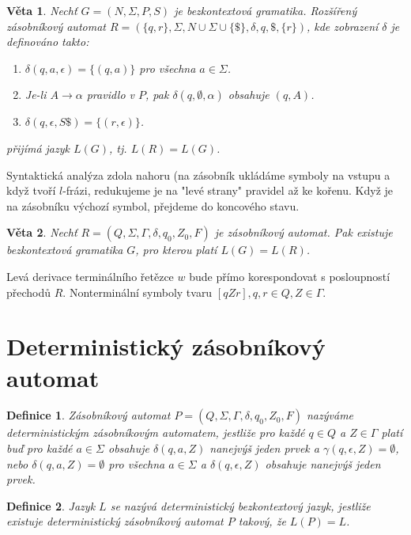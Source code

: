 \documentclass[a4paper, 11pt]{report}
\newtheorem{mydef}{Definice}[chapter]
\newtheorem{veta}{Věta}[chapter]
\begin{document}
\begin{veta}
Nechť $G = (N, \Sigma, P, S)$ je bezkontextová gramatika. Rozšířený zásobníkový automat $R = (\{q,r\}, \Sigma, N \cup \Sigma \cup \{\$\}, \delta, q, \$, \{r\})$, kde zobrazení $\delta$ je definováno takto:
\begin{enumerate}
	\item $\delta(q, a, \epsilon) = \{(q, a)\}$ pro všechna $a \in \Sigma$.
	\item Je-li $A \to \alpha$ pravidlo v $P$, pak $\delta(q, \emptyset, \alpha)$ obsahuje $(q, A)$.
	\item $\delta(q, \epsilon, S\$) = \{(r, \epsilon)\}$.
\end{enumerate}
přijímá jazyk $L(G)$, tj. $L(R) = L(G)$.
\end{veta}

Syntaktická analýza zdola nahoru (na zásobník ukládáme symboly na vstupu a když tvoří $l$-frázi, redukujeme je na "levé strany" pravidel až ke kořenu. Když je na zásobníku výchozí symbol, přejdeme do koncového stavu.

\begin{veta}
Nechť $R = (Q, \Sigma, \Gamma, \delta, q_0, Z_0, F)$ je zásobníkový automat. Pak existuje bezkontextová gramatika $G$, pro kterou platí $L(G) = L(R)$.
\end{veta}
Levá derivace terminálního řetězce $w$ bude přímo korespondovat s posloupností přechodů $R$. Nonterminální symboly tvaru $[qZr], q,r \in Q, Z \in \Gamma$.

\section{Deterministický zásobníkový automat}

\begin{mydef}
Zásobníkový automat $P = (Q, \Sigma, \Gamma, \delta, q_0, Z_0, F)$ nazýváme deterministickým zásobníkovým automatem, jestliže pro každé $q \in Q$ a $Z \in \Gamma$ platí buď pro každé $a \in \Sigma$ obsahuje $\delta(q, a, Z)$ nanejvýš jeden prvek a $\gamma(q, \epsilon, Z) = \emptyset$, nebo $\delta(q, a, Z) = \emptyset$ pro všechna $a \in \Sigma$ a $\delta(q, \epsilon, Z)$ obsahuje nanejvýš jeden prvek.
\end{mydef}

\begin{mydef}
Jazyk $L$ se nazývá \emph{deterministický bezkontextový jazyk}, jestliže existuje deterministický zásobníkový automat $P$ takový, že $L(P) = L$.
\end{mydef}
\end{document}
